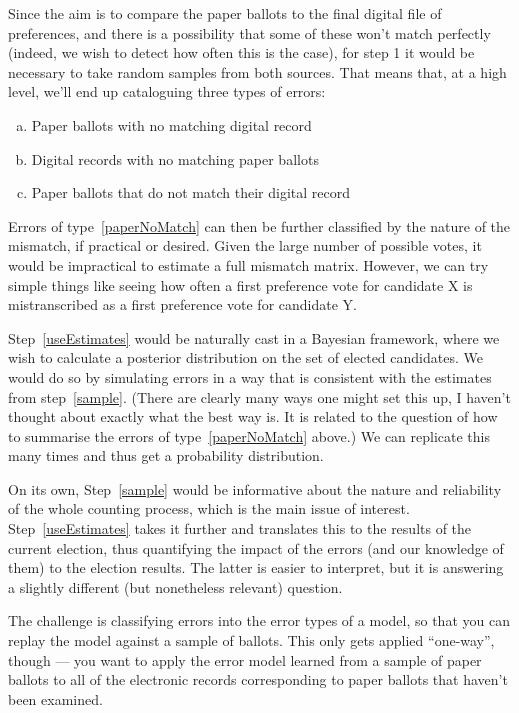 \documentclass[10pt,a4paper]{article}
\begin{document}
{    Since the aim is to compare the paper ballots to the final digital file of preferences, and there is a possibility that some of these won't match perfectly (indeed, we wish to detect how often this is the case), for step 1 it would be necessary to take random samples from both sources.  That means that, at a high level, we'll end up cataloguing three types of errors:

\begin{enumerate}[(a)]
    \item Paper ballots with no matching digital record
    \item Digital records with no matching paper ballots
    \item Paper ballots that do not match their digital record \label{paperNoMatch}
\end{enumerate}

    Errors of type~\ref{paperNoMatch}  can then be further classified by the nature of the mismatch, if practical or desired.  Given the large number of possible votes, it would be impractical to estimate a full mismatch matrix.  However, we can try simple things like seeing how often a first preference vote for candidate X is mistranscribed as a first preference vote for candidate Y.

    Step~\ref{useEstimates}  would be naturally cast in a Bayesian framework, where we wish to calculate a posterior distribution on the set of elected candidates.  We would do so by simulating errors in a way that is consistent with the estimates from step~\ref{sample}.  (There are clearly many ways one might set this up, I haven't thought about exactly what the best way is.  It is related to the question of how to summarise the errors of type~\ref{paperNoMatch}  above.)  We can replicate this many times and thus get a probability distribution.

    On its own, Step~\ref{sample} would be informative about the nature and reliability of the whole counting process, which is the main issue of interest.  Step~\ref{useEstimates} takes it further and translates this to the results of the current election, thus quantifying the impact of the errors (and our knowledge of them) to the election results.  The latter is easier to interpret, but it is answering a slightly different (but nonetheless relevant) question.


The challenge is classifying errors into the
error types of a model, so that you can replay the model
against a sample of ballots.   This only gets applied
``one-way'', though --- you want to apply the error model
learned from a sample of paper ballots to all of the electronic
records corresponding to paper ballots that haven't been
examined.
} %


\end{document}
